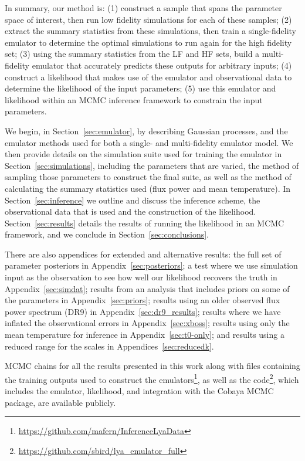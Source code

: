 \documentclass[a4paper,11pt]{article}
\begin{document}
In summary, our method is: (1) construct a sample that spans the parameter space of interest, then run low fidelity simulations for each of these samples; (2) extract the summary statistics from these simulations, then train a single-fidelity emulator to determine the optimal simulations to run again for the high fidelity set; (3) using the summary statistics from the LF and HF sets, build a multi-fidelity emulator that accurately predicts these outputs for arbitrary inputs; (4) construct a likelihood that makes use of the emulator and observational data to determine the likelihood of the input parameters; (5) use this emulator and likelihood within an MCMC inference framework to constrain the input parameters.

We begin, in Section~\ref{sec:emulator}, by describing Gaussian processes, and the emulator methods used for both a single- and multi-fidelity emulator model.
We then provide details on the simulation suite used for training the emulator in Section~\ref{sec:simulations}, including the parameters that are varied, the method of sampling those parameters to construct the final suite, as well as the method of calculating the summary statistics used (flux power and mean temperature).
In Section~\ref{sec:inference} we outline and discuss the inference scheme, the observational data that is used and the construction of the likelihood.
Section~\ref{sec:results} details the results of running the likelihood in an MCMC framework, and we conclude in Section~\ref{sec:conclusions}.

There are also appendices for extended and alternative results:
the full set of parameter posteriors in Appendix~\ref{sec:posteriors};
a test where we use simulation input as the observation to see how well our likelihood recovers the truth in Appendix~\ref{sec:simdat};
results from an analysis that includes priors on some of the parameters in Appendix~\ref{sec:priors};
results using an older observed flux power spectrum (DR9) in Appendix~\ref{sec:dr9_results};
results where we have inflated the observational errors in Appendix~\ref{sec:xboss};
results using only the mean temperature for inference in Appendix~\ref{sec:t0-only};
and results using a reduced range for the scales in Appendices~\ref{sec:reducedk}.

MCMC chains for all the results presented in this work along with files containing the training outputs used to construct the emulators\footnote{\url{https://github.com/mafern/InferenceLyaData}}, as well as the code\footnote{\url{https://github.com/sbird/lya_emulator_full}}, which includes the emulator, likelihood, and integration with the Cobaya MCMC package, are available publicly.
\end{document}
